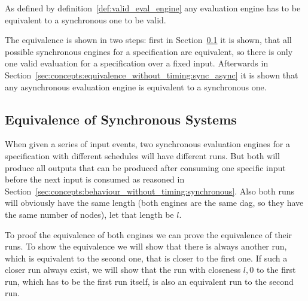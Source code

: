 As defined by definition~\ref{def:valid_eval_engine} any evaluation engine has to be equivalent to a synchronous one to be valid.

The equivalence is shown in two steps: first in Section~\ref{sec:concepts:equivalence_without_timing:synchronous} it is shown, that all possible synchronous engines for a specification are equivalent, so there is only one valid evaluation for a specification over a fixed input.
Afterwards in Section~\ref{sec:concepts:equivalence_without_timing:sync_async} it is shown that any asynchronous evaluation engine is equivalent to a synchronous one.


\subsection{Equivalence of Synchronous Systems}
\label{sec:concepts:equivalence_without_timing:synchronous}

When given a series of input events, two synchronous evaluation engines for a specification with different schedules will have different runs.
But both will produce all outputs that can be produced after consuming one specific input before the next input is consumed as reasoned in Section~\ref{sec:concepts:behaviour_without_timing:synchronous}.
Also both runs will obviously have the same length (both engines are the same \gls{dag}, so they have the same number of nodes), let that length be \(l\).

To proof the equivalence of both engines we can prove the equivalence of their runs.
To show the equivalence we will show that there is always another run, which is equivalent to the second one, that is closer to the first one.
If such a closer run always exist, we will show that the run with closeness \(l, 0\) to the first run, which has to be the first run itself, is also an equivalent run to the second run.

